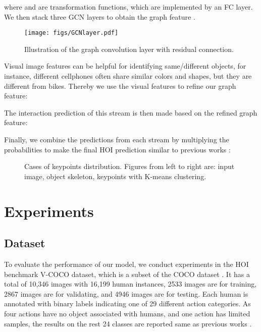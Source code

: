 \documentclass[a4paper, 10pt, conference]{IEEEtran}
\begin{document}
where  and  are transformation functions, which are implemented by an FC layer. We then stack three GCN layers to obtain the graph feature . 

\begin{figure}[htbp]
	\setlength{\abovecaptionskip}{5pt} 
	\centering
	\texttt{[image: figs/GCNlayer.pdf]}
	\caption{\footnotesize{Illustration of the graph convolution layer with residual connection.}}
	\label{Fig: gcnlayer}
\end{figure}

Visual image features can be helpful for identifying same/different objects, for instance, different cellphones often share similar colors and shapes, but they are different from bikes. Thereby we use the visual features to refine our graph feature:


The interaction prediction  of this stream is then made based on the refined graph feature:


Finally, we combine the predictions from each stream by multiplying the probabilities to make the final HOI prediction  similar to previous works \cite{iCAN,InteractNet,TIN,VSGNet}:



\begin{figure*}[htbp]
	\centering
    \quad
	\caption{Cases of keypoints distribution. Figures from left to right are: input image, object skeleton, keypoints with K-means clustering.} 
	\label{case} 
\end{figure*}

\section{Experiments}
\subsection{Dataset}
To evaluate the performance of our model, we conduct experiments in the HOI benchmark V-COCO \cite{VSRL} dataset, which is a subset of the COCO dataset \cite{COCO}. It has a total of 10,346 images with 16,199 human instances, 2533 images are for training, 2867 images are for validating, and 4946 images are for testing. Each human is annotated with binary labels indicating one of 29 different action categories. As four actions have no object associated with humans, and one action has limited samples, the results on the rest 24 classes are reported same as previous works \cite{VSRL,PMFNet,VSGNet}.
\end{document}
